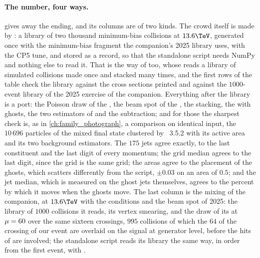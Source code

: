 \paragraph{The number, four ways.}
\label{sec:crowd_on_the_road:validation}
\label{sec:crowd_on_the_road:standalone_code}
 gives away the ending, and its columns
are of two kinds. The crowd itself is made by \PYTHIA: a library of two
thousand minimum-bias collisions at $13.6\TeV$, generated once with the
minimum-bias fragment the companion's 2025 library uses,  with the CP5
tune, and stored as a record, so that the standalone script needs NumPy
and nothing else to read it. That is the way of \CMSSW too, whose \Mix
reads a library of simulated collisions made once and stacked many
times, and the first rows of the table check the library against the
cross sections \PYTHIA printed and against the $1000$-event library of the
2025 \CMSSW exercise of the companion. Everything after the library is a
port: the Poisson draw of the \Mix, the beam spot of the
, the stacking, the \antikt with ghosts, the
two estimators of \rhoPU and the subtraction; and for those the sharpest
check is, as in \cref{ch:family_photograph}, a comparison on identical
input, the $10\,696$ particles of the mixed final state clustered by
\FASTJET~3.5.2 with its active area and its two background estimators.
The $175$ jets agree exactly, to the last constituent and the last digit
of every momentum; the grid median agrees to the last digit, since the
grid is the same grid; the areas agree to the placement of the ghosts,
which \FASTJET scatters differently from the script, $\pm0.03$ on an area
of $0.5$; and the jet median, which is measured on the ghost jets
themselves, agrees to the percent by which it moves when the ghosts move.
The last column is the \CMSSW mixing of the companion,
 at $13.6\TeV$ with the conditions and the beam spot of 2025: the
library of $1000$ collisions it reads, its vertex smearing, and the draw of
its \Mix at $\mu=60$ over the same sixteen crossings, $995$ collisions of
which the $64$ of the crossing of our event are overlaid on the signal at
generator level, before the hits of \GEANT are involved; the standalone
script reads its library the same way, in order from the first event,
with .

